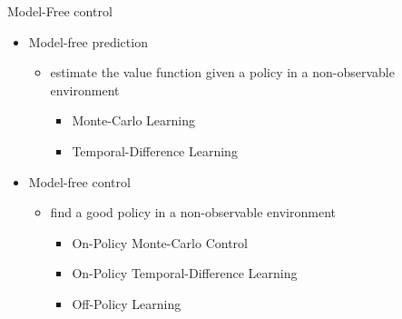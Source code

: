 \bgroup
\begin{frame}{Model-Free control}
\begin{itemize}
\item \textcolor{mImagelabRed}{Model-free prediction}
\begin{itemize}
\item estimate the value function given a policy in a non-observable environment
\begin{itemize}
\item Monte-Carlo Learning
\item Temporal-Difference Learning
\end{itemize}
\end{itemize}
\item \textcolor{mImagelabRed}{Model-free control}
\begin{itemize}
\item find a good policy in a non-observable environment
\begin{itemize}
\item On-Policy Monte-Carlo Control
\item On-Policy Temporal-Difference Learning
\item Off-Policy Learning
\end{itemize}
\end{itemize}
\end{itemize}
\end{frame}
\egroup